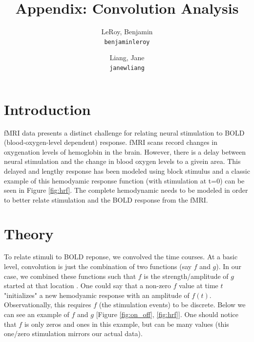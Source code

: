 \documentclass[11pt]{article}
\title{Appendix: Convolution Analysis}
\author{
  LeRoy, Benjamin\\
  \texttt{benjaminleroy}
  \and
  Liang, Jane\\
  \texttt{janewliang}
}
\begin{document}
\maketitle


\section{Introduction}

fMRI data presents a distinct challenge for relating neural stimulation 
to BOLD (blood-oxygen-level dependent) response. fMRI scans record changes 
in oxygenation levels of hemoglobin in the brain. However, there is a delay 
between neural stimulation and the change in blood oxygen levels to a givein 
area. This delayed and lengthy response has been modeled using block stimulus 
and a classic example of this hemodyamic response function (with stimulation 
at t=0) can be seen in Figure \ref{fig:hrf}. The complete hemodynamic needs 
to be modeled in order to better relate  stimulation and the BOLD response 
from the fMRI.

\section{Theory}

To relate stimuli to BOLD reponse, we convolved the time courses. At a basic 
level, convolution is just the combination of two functions (say $f$ and $g$). 
In our case, we combined these functions such that $f$ is the strength/amplitude 
of $g$ started at that location \cite{brett2015course}. One could say that a non-zero $f$ value at time $t$  "initializes" a new hemodyamic response with an amplitude of $f(t)$.  Observationally, this requires $f$ (the stimulation events) to be discrete. Below we can see an example of $f$ and $g$ [Figure \ref{fig:on_off}, \ref{fig:hrf}]. One should notice that $f$ is only zeros and ones in this example, but can be many values (this one/zero stimulation mirrors our actual data).
\end{document}

